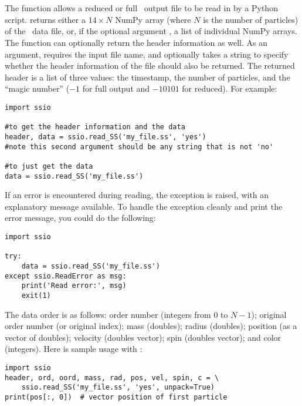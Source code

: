 \section{}
The  function allows a reduced or full \pkd\ output
file to be read in by a Python script.   returns
either a $14 \times N$ NumPy array (where $N$ is the number of
particles) of the \pkd\ data file, or, if the optional
argument , a list of individual NumPy arrays.  The
function can optionally return the header information as well.  As an
argument,  requires the input file name, and
optionally takes a string to specify whether the header information of
the file should also be returned.  The returned header is a list of
three values: the timestamp, the number of particles, and the ``magic
number'' ($-1$ for full output and $-10101$ for reduced).  For example:
\begin{verbatim}
import ssio

#to get the header information and the data
header, data = ssio.read_SS('my_file.ss', 'yes')
#note this second argument should be any string that is not 'no'

#to just get the data
data = ssio.read_SS('my_file.ss')
\end{verbatim}
If an error is encountered during reading, the 
exception is raised, with an explanatory message available.  To handle
the exception cleanly and print the error message, you could do the
following:
\begin{verbatim}
import ssio

try:
    data = ssio.read_SS('my_file.ss')
except ssio.ReadError as msg:
    print('Read error:', msg)
    exit(1)
\end{verbatim}
The data order is as follows: order number (integers from 0 to $N -
1$); original order number (or original index); mass (doubles); radius
(doubles); position (as a vector of doubles); velocity (doubles
vector); spin (doubles vector); and color (integers).  Here is sample
usage with :
\begin{verbatim}
import ssio
header, ord, oord, mass, rad, pos, vel, spin, c = \
    ssio.read_SS('my_file.ss', 'yes', unpack=True)
print(pos[:, 0])  # vector position of first particle
\end{verbatim}

